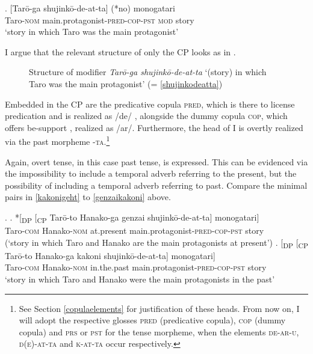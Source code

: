 \exg. [Tarō-ga shujinkō-de-at-ta] (*no) monogatari\\
Taro-\textsc{nom} main.protagonist-\textsc{pred-cop-pst} \textsc{mod} story\\
`story in which Taro was the main protagonist' \\ \null \hfill \citep[66]{watanabe:2010:notes}  \label{shujinkodeatta}

I argue that the relevant structure of only the CP looks as in .

 \begin{figure}
\centering
{}
\caption{Structure of modifier \textit{Tarō-ga shujinkō-de-at-ta} `(story) in which Taro was the main protagonist’ (= \ref{shujinkodeatta})}
\label{Structure shujinko de atta}
\end{figure}

Embedded in the CP are the predicative copula \textsc{pred}, which is there to license predication and is realized as /de/ \citep{bowers:1993:predication, nishiyama:1999:adj}, alongside the dummy copula \textsc{cop}, which offers be-support \citep{doron:1983:verbless, rapoport:1987:copular}, realized as /ar/. Furthermore, the head of I is overtly realized via the past morpheme -\textsc{ta}.\footnote{See Section \ref{copulaelements} for justification of these heads. From now on, I will adopt the respective glosses \textsc{pred} (predicative copula), \textsc{cop} (dummy copula) and \textsc{prs} or \textsc{pst} for the tense morpheme, when the elements \textsc{de-ar-u}, \textsc{d(e)-at-ta} and \textsc{k-at-ta} occur respectively.}

Again, overt tense, in this case past tense, is expressed. This can be evidenced via the impossibility to include a temporal adverb referring to the present, but the possibility of including a temporal adverb referring to past. Compare the minimal pairs in \ref{kakonigeht} to \ref{genzaikakoni} above.

\ex. \label{kakonigeht} \ag. *[\textsubscript{DP} [\textsubscript{CP} Tarō-to Hanako-ga genzai shujinkō-de-at-ta] monogatari]\\
{} {} Taro-\textsc{com} Hanako-\textsc{nom} at.present main.protagonist-\textsc{pred-cop-pst} story\\
(`story in which Taro and Hanako are the main protagonists at present’)
 \bg. [\textsubscript{DP} [\textsubscript{CP} Tarō-to Hanako-ga kakoni shujinkō-de-at-ta] monogatari]\\
{} {} Taro-\textsc{com} Hanako-\textsc{nom} in.the.past main.protagonist-\textsc{pred-cop-pst} story\\
`story in which Taro and Hanako were the main protagonists in the past’

